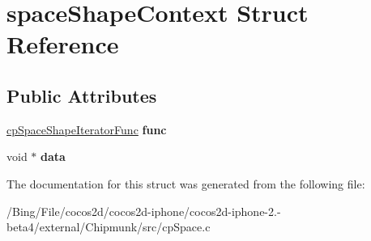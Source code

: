 \hypertarget{structspace_shape_context}{\section{space\-Shape\-Context Struct Reference}
\label{structspace_shape_context}
}
\subsection*{Public Attributes}
\begin{DoxyCompactItemize}
\item 
\hypertarget{structspace_shape_context_a432fece29e1946b7b22655209f6d7b19}{\hyperlink{group__cp_space_ga780ed0f29f957005efb4e24df64883b2}{cp\-Space\-Shape\-Iterator\-Func} {\bfseries func}}\label{structspace_shape_context_a432fece29e1946b7b22655209f6d7b19}

\item 
\hypertarget{structspace_shape_context_a1b046be292518f44b0d7cca57b998be3}{void $\ast$ {\bfseries data}}\label{structspace_shape_context_a1b046be292518f44b0d7cca57b998be3}

\end{DoxyCompactItemize}


The documentation for this struct was generated from the following file\-:\begin{DoxyCompactItemize}
\item 
/\-Bing/\-File/cocos2d/cocos2d-\/iphone/cocos2d-\/iphone-\/2.-\/beta4/external/\-Chipmunk/src/cp\-Space.\-c\end{DoxyCompactItemize}
